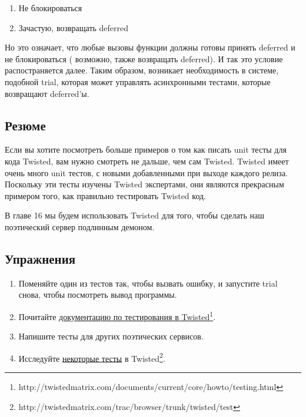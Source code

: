 \begin{enumerate}

\item Не блокироваться
\item Зачастую, возвращать deferred

\end{enumerate}


Но это означает, что любые вызовы функции должны 
готовы принять deferred и не блокироваться (
возможно, также возвращать deferred). И так это условие 
распостраняется далее. Таким образом, возникает необходимость в системе, 
подобной trial, которая может управлять асинхронными тестами, которые 
возвращают deferred'ы.

\subsection{Резюме}

Если вы хотите посмотреть больше 
примеров о том как писать unit тесты для кода Twisted, 
вам нужно смотреть не дальше, чем сам Twisted. Twisted 
имеет очень много unit тестов, с новыми добавленными при  
выходе каждого релиза. Поскольку эти тесты изучены 
Twisted экспертами, они являются прекрасным примером того, как 
правильно тестировать Twisted код.


В главе 16 мы будем использовать Twisted для того, чтобы 
сделать наш поэтический сервер подлинным демоном.

\subsection{Упражнения}

\begin{enumerate}

\item Поменяйте один из тестов так, чтобы вызвать ошибку, и 
запустите trial снова, чтобы посмотреть вывод программы.

\item Почитайте \href{http://twistedmatrix.com/documents/current/core/howto/testing.html}{документацию по тестирования в Twisted}\footnote[1]{http://twistedmatrix.com/documents/current/core/howto/testing.html}.

\item Напишите тесты для других поэтических сервисов.

\item Исследуйте \href{http://twistedmatrix.com/trac/browser/trunk/twisted/test}{некоторые тесты} в 
Twisted\footnote{http://twistedmatrix.com/trac/browser/trunk/twisted/test}.

\end{enumerate}

